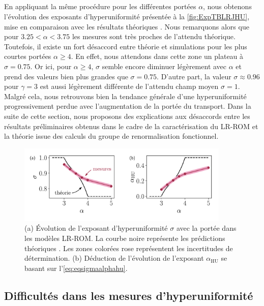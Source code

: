 \subparagraph{}En appliquant la même procédure pour les différentes portées $\alpha$, nous obtenons l'évolution des exposants d'hyperuniformité présentée à la \autoref{fig:ExpTBLRJHU}, mise en comparaison avec les résultats théoriques \cite{wiese_longrange}. Nous remarquons alors que pour $3.25 < \alpha < 3.75$ les mesures sont très proches de l'attendu théorique. Toutefois, il existe un fort désaccord entre théorie et simulations pour les plus courtes portées $\alpha \geq 4$. En effet, nous attendons dans cette zone un plateau à $\sigma = 0.75$. Or ici, pour $\alpha \geq 4$, $\sigma$ semble encore diminuer légèrement avec $\alpha$ et prend des valeurs bien plus grandes que $\sigma = 0.75$. D'autre part, la valeur $\sigma \approx 0.96$ pour $\gamma = 3$ est aussi légèrement différente de l'attendu champ moyen $\sigma = 1$. Malgré cela, nous retrouvons bien la tendance générale d'une hyperuniformité progressivement perdue avec l'augmentation de la portée du transport. Dans la suite de cette section, nous proposons des explications aux désaccords entre les résultats préliminaires obtenus dans le cadre de la caractérisation du LR-ROM et la théorie issue des calculs du groupe de renormalisation fonctionnel.

\begin{figure}[h]
	\centering	\includegraphics[width=0.9\textwidth]{Chapitre2/Figures/Hyperuniformity/eta_alpha_jumps.pdf}
	\caption{(a) Évolution de l'exposant d'hyperuniformité $\sigma$ avec la portée dans les modèles LR-ROM. La courbe noire représente les prédictions théoriques \cite{wiese_hyperuniformity_2024, wiese_theory_2022, wiese_longrange}. Les zones colorées rose représentent les incertitudes de détermination. (b) Déduction de l'évolution de l'exposant $\alpha_\text{HU}$ se basant sur l'\autoref{eq:eqsigmaalphahu}.}
	\label{fig:ExpTBLRJHU}
\end{figure}

\subsection{Difficultés dans les mesures d'hyperuniformité}

